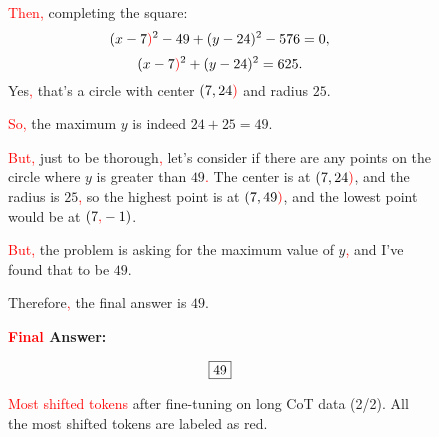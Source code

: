 \begin{figure*}[htbp]
    \centering
\begin{tcolorbox}[title=Example of \textcolor{red}{most shifted tokens} after fine-tuning on long CoT data (2/2), promptstyle]
\lstset{
    basicstyle=\normalfont\sffamily\footnotesize,
    breaklines=true,
    frame=none,
    columns=fullflexible,
}
\textcolor{red}{Then}\textcolor{red}{,} completing the square:
\[
(x - 7\textcolor{red}{)}^2 - 49 + (y - 24)^2 - 576 = 0,
\]
\[
(x - 7\textcolor{red}{)}^2 + (y - 24)^2 = 625.
\]
Yes\textcolor{red}{,} that's a circle with center \((7, 24\textcolor{red}{)}\) and radius \(25\).

\textcolor{red}{So}\textcolor{red}{,} the maximum \(y\) is indeed \(24 + 25 = 49\).

\textcolor{red}{But}\textcolor{red}{,} just to be thorough\textcolor{red}{,} let's consider if there are any points on the circle where \(y\) is greater than \(49\)\textcolor{red}{.} The center is at \((7, 24\textcolor{red}{)}\), and the radius is \(25\)\textcolor{red}{,} so the highest point is at \((7, 49\textcolor{red}{)}\), and the lowest point would be at \((7\textcolor{red}{,} -1)\).

\textcolor{red}{But}\textcolor{red}{,} the problem is asking for the maximum value of \(y\)\textcolor{red}{,} and I've found that to be \(49\).

Therefore\textcolor{red}{,} the final answer is \(49\).

\bigskip

\textbf{\textcolor{red}{Final} Answer:}

\[
\boxed{49\textcolor{red}{}}
\]
\end{tcolorbox}
\caption{\textcolor{red}{Most shifted tokens} after fine-tuning on long CoT data (2/2). All the most shifted tokens are labeled as red.}
    \label{fig: most_shifted_2}
\end{figure*}






